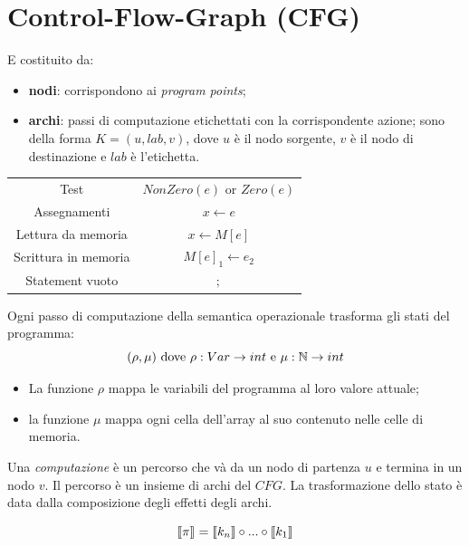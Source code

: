 \documentclass[a4paper, 11pt]{report}
\begin{document}
	\section*{Control-Flow-Graph (CFG)}
	E costituito da:
	\begin{itemize}
		\item \textbf{nodi}: corrispondono ai \textit{program points};
		\item \textbf{archi}: passi di computazione etichettati con la corrispondente azione; sono della forma $K=(u, lab, v)$, dove $u$ è il nodo sorgente, $v$ è il nodo di destinazione e $lab$ è l'etichetta.
	\end{itemize}	
		\begin{center}
			\begin{tabular}{cc}
				\hline
				Test & $NonZero(e)$ or $Zero(e)$ \\
				Assegnamenti & $x \leftarrow e$ \\
				Lettura da memoria & $x \leftarrow M[e]$ \\
				Scrittura in memoria & $M[e]_1 \leftarrow e_2$ \\
				Statement vuoto & $;$ \\
				\hline
			\end{tabular}
		\end{center}

Ogni passo di computazione della semantica operazionale trasforma gli stati del programma:
\begin{equation*}
(\rho, \mu) \textnormal{ dove } \rho: Var \to int \textnormal{ e } \mu : \mathbb{N} \to int
\end{equation*}
\begin{itemize}
	\item La funzione $\rho$ mappa le variabili del programma al loro valore attuale;
	\item la funzione $\mu$ mappa ogni cella dell'array al suo contenuto nelle celle di memoria.
\end{itemize}

Una \textit{computazione} è un percorso che và da un nodo di partenza $u$ e termina in un nodo $v$. Il percorso è un insieme di archi del $CFG$. La trasformazione dello stato è data dalla composizione degli effetti degli archi.

\begin{equation*}
	\llbracket \pi\rrbracket\hspace{0.01cm} = \llbracket k_n\rrbracket \circ ... \circ \llbracket k_1\rrbracket
\end{equation*}
 
\end{document}
